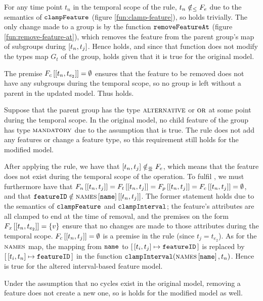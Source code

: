 For any time point $t_n$ in the temporal scope of the rule, $t_n \notin_\leq F_e$ due to the semantics of $\texttt{clampFeature}$ (figure \vref{fun:clamp-feature}), so  holds trivially.  The only change made to a group is by the function $\texttt{removeFeatureAt}$ (figure \vref{fun:remove-feature-at}), which removes the feature from the parent group's map of subgroups during $\interval{t_n}{t_j}$. Hence  holds, and since that function does not modify the types map $G_t$ of the group,  holds given that it is true for the original model. 

The premise $\lookup{F_c}{\interval{t_n}{t_{e_2}}} = \emptyset$ ensures that the feature to be removed does not have any subgroups during the temporal scope, so no group is left without a parent in the updated model. Thus  holds. 

Suppose that the parent group has the type $\textsc{alternative}{}$ or $\textsc{or}{}$ at some point during the temporal scope. In the original model, no child feature of the group has type $\textsc{mandatory}{}$ due to the assumption that  is true. The  rule does not add any features or change a feature type, so this requirement still holds for the modified model. 

After applying the rule, we have that $\interval{t_n}{t_j} \notinnr F_e$, which means that the feature does not exist during the temporal scope of the operation. To fulfil , we must furthermore have that $\lookup{F_n}{\interval{t_n}{t_j}} = \lookup{F_t}{\interval{t_n}{t_j}}= \lookup{F_p}{\interval{t_n}{t_j}} = \lookup{F_c}{\interval{t_n}{t_j}} = \emptyset$, and that $\var{featureID} \notin \lookup{\lookup{\names}{\var{name}}}{\interval{t_n}{t_j}}$. The former statement holds due to the semantics of $\texttt{clampFeature}$ and $\texttt{clampInterval}$; the feature's attributes are all clamped to end at the time of removal, and the premises on the form $\lookup{F_x}{\interval{t_n}{t_{e_2}}} = \set{v}$ ensure that no changes are made to those attributes during the temporal scope. $\lookup{F_c}{\interval{t_n}{t_j}} = \emptyset$ is a premise in the rule (since $t_j = t_{e_2}$). As for the $\textsc{names}$ map, the mapping from $\texttt{name}$ to $\intervalmapping{t_i}{t_j}{\var{featureID}}$ is replaced by $\intervalmapping{t_i}{t_n}{\var{featureID}}$ in the function $\texttt{clampInterval}(\textsc{names} \left[ \texttt{name} \right], t_n)$. Hence  is true for the altered interval-based feature model.

Under the assumption that no cycles exist in the original model, removing a feature does not create a new one, so  is holds for the modified model as well.
\\

